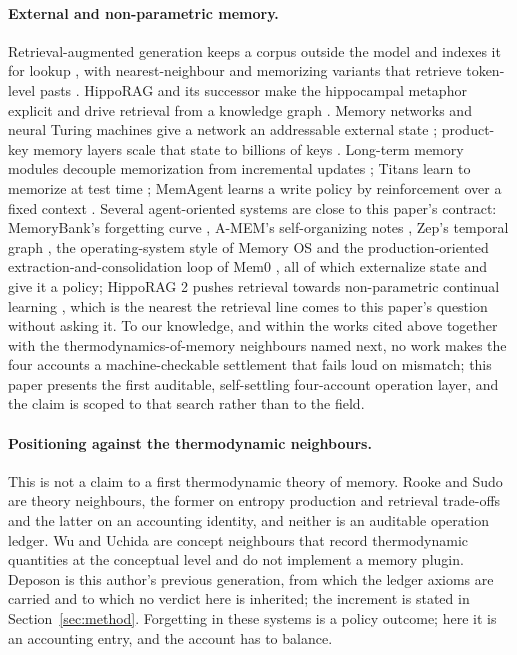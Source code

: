 \documentclass[11pt,a4paper]{article}
\begin{document}
\paragraph{External and non-parametric memory.}
Retrieval-augmented generation keeps a corpus outside the model and indexes it for lookup \citep{rag2020,realm2020,retro2022}, with nearest-neighbour and memorizing variants that retrieve token-level pasts \citep{knnlm2020,memorizing2022}. HippoRAG and its successor make the hippocampal metaphor explicit and drive retrieval from a knowledge graph \citep{hipporag2024,hipporag2}. Memory networks and neural Turing machines give a network an addressable external state \citep{memnn2015,ntm2014}; product-key memory layers scale that state to billions of keys \citep{pkm2019,memlayers2025}. Long-term memory modules decouple memorization from incremental updates \citep{longmem2023}; Titans learn to memorize at test time \citep{titans2025}; MemAgent learns a write policy by reinforcement over a fixed context \citep{memagent2026}. Several agent-oriented systems are close to this paper's contract: MemoryBank's forgetting curve \citep{memorybank2023}, A-MEM's self-organizing notes \citep{amem2025}, Zep's temporal graph \citep{zep2025}, the operating-system style of Memory OS \citep{memoryos2025} and the production-oriented extraction-and-consolidation loop of Mem0 \citep{mem02025}, all of which externalize state and give it a policy; HippoRAG 2 pushes retrieval towards non-parametric continual learning \citep{hipporag22025}, which is the nearest the retrieval line comes to this paper's question without asking it. To our knowledge, and within the works cited above together with the thermodynamics-of-memory neighbours named next, no work makes the four accounts a machine-checkable settlement that fails loud on mismatch; this paper presents the first auditable, self-settling four-account operation layer, and the claim is scoped to that search rather than to the field.

\paragraph{Positioning against the thermodynamic neighbours.}
This is not a claim to a first thermodynamic theory of memory. Rooke \citep{rooke2026} and Sudo \citep{sudo2026} are theory neighbours, the former on entropy production and retrieval trade-offs and the latter on an accounting identity, and neither is an auditable operation ledger. Wu \citep{wuFDS1} and Uchida \citep{uchida} are concept neighbours that record thermodynamic quantities at the conceptual level and do not implement a memory plugin. Deposon \citep{deposon2026} is this author's previous generation, from which the ledger axioms are carried and to which no verdict here is inherited; the increment is stated in Section~\ref{sec:method}. Forgetting in these systems is a policy outcome; here it is an accounting entry, and the account has to balance.
\end{document}
